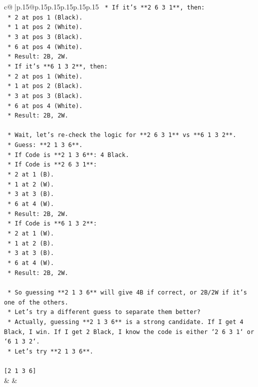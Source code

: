 \documentclass{article}
\begin{document}
{\begin{supertabular}{c@{$\;$}|p{.15\linewidth}@{}p{.15\linewidth}p{.15\linewidth}p{.15\linewidth}p{.15\linewidth}p{.15\linewidth}}
{{{\texttt{    *   If it's **2 6 3 1**, then:} \\
\texttt{        *   2 at pos 1 (Black).} \\
\texttt{        *   1 at pos 2 (White).} \\
\texttt{        *   3 at pos 3 (Black).} \\
\texttt{        *   6 at pos 4 (White).} \\
\texttt{        *   Result: 2B, 2W.} \\
\texttt{    *   If it's **6 1 3 2**, then:} \\
\texttt{        *   2 at pos 1 (White).} \\
\texttt{        *   1 at pos 2 (Black).} \\
\texttt{        *   3 at pos 3 (Black).} \\
\texttt{        *   6 at pos 4 (White).} \\
\texttt{        *   Result: 2B, 2W.} \\
\\ 
\texttt{    *   Wait, let's re{-}check the logic for **2 6 3 1** vs **6 1 3 2**.} \\
\texttt{    *   Guess: **2 1 3 6**.} \\
\texttt{        *   If Code is **2 1 3 6**: 4 Black.} \\
\texttt{        *   If Code is **2 6 3 1**:} \\
\texttt{            *   2 at 1 (B).} \\
\texttt{            *   1 at 2 (W).} \\
\texttt{            *   3 at 3 (B).} \\
\texttt{            *   6 at 4 (W).} \\
\texttt{            *   Result: 2B, 2W.} \\
\texttt{        *   If Code is **6 1 3 2**:} \\
\texttt{            *   2 at 1 (W).} \\
\texttt{            *   1 at 2 (B).} \\
\texttt{            *   3 at 3 (B).} \\
\texttt{            *   6 at 4 (W).} \\
\texttt{            *   Result: 2B, 2W.} \\
\\ 
\texttt{    *   So guessing **2 1 3 6** will give 4B if correct, or 2B/2W if it's one of the others.} \\
\texttt{    *   Let's try a different guess to separate them better?} \\
\texttt{    *   Actually, guessing **2 1 3 6** is a strong candidate. If I get 4 Black, I win. If I get 2 Black, I know the code is either `2 6 3 1` or `6 1 3 2`.} \\
\texttt{    *   Let's try **2 1 3 6**.} \\
\\ 
\texttt{{[}2 1 3 6{]}} \\
            }
        }
    }
    & & \\ \\


\end{supertabular}}
\end{document}
